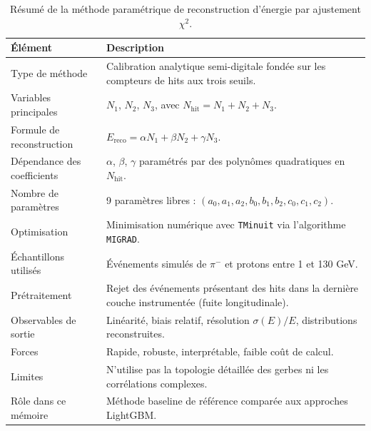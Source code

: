 \begin{table}[H]
\centering
\caption{Résumé de la méthode paramétrique de reconstruction d’énergie par ajustement \(\chi^2\).}
\begin{tabularx}{\textwidth}{>{\raggedright\arraybackslash}p{4.2cm}X}
\toprule
\textbf{Élément} & \textbf{Description} \\
\midrule

Type de méthode &
Calibration analytique semi-digitale fondée sur les compteurs de hits aux trois seuils. \\

Variables principales &
\(N_1\), \(N_2\), \(N_3\), avec \(N_{\mathrm{hit}}=N_1+N_2+N_3\). \\

Formule de reconstruction &
\(E_{\mathrm{reco}}=\alpha N_1+\beta N_2+\gamma N_3\). \\

Dépendance des coefficients &
\(\alpha\), \(\beta\), \(\gamma\) paramétrés par des polynômes quadratiques en \(N_{\mathrm{hit}}\). \\

Nombre de paramètres &
9 paramètres libres :
\((a_0,a_1,a_2,b_0,b_1,b_2,c_0,c_1,c_2)\). \\

Optimisation &
Minimisation numérique avec \texttt{TMinuit} via l’algorithme \texttt{MIGRAD}. \\

Échantillons utilisés &
Événements simulés de \(\pi^-\) et protons entre 1 et 130 GeV. \\

Prétraitement &
Rejet des événements présentant des hits dans la dernière couche instrumentée (fuite longitudinale). \\

Observables de sortie &
Linéarité, biais relatif, résolution \(\sigma(E)/E\), distributions reconstruites. \\

Forces &
Rapide, robuste, interprétable, faible coût de calcul. \\

Limites &
N’utilise pas la topologie détaillée des gerbes ni les corrélations complexes. \\

Rôle dans ce mémoire &
Méthode baseline de référence comparée aux approches LightGBM. \\

\bottomrule
\end{tabularx}
\end{table}
